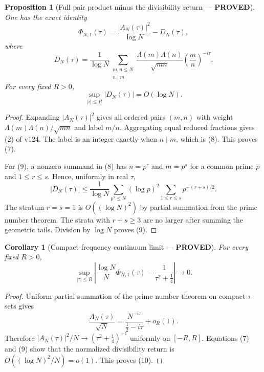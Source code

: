 \documentclass[11pt]{article}
\newcommand{\PROVED}{\textcolor{green!40!black}{\textbf{PROVED}}}
\newtheorem{proposition}{Proposition}
\newtheorem{corollary}{Corollary}
\begin{document}
\begin{proposition}[Full pair product minus the divisibility return ---
\PROVED]
One has the exact identity
\begin{equation}
 \boxed{
 \Phi_{N,1}(\tau)
 =\frac{|A_N(\tau)|^2}{\log N}-D_N(\tau),}                \tag{7}
\end{equation}
where
\begin{equation}
 D_N(\tau)=\frac1{\log N}
 \sum_{\substack{m,n\le N\\n\mid m}}
 \frac{\Lambda(m)\Lambda(n)}{\sqrt{mn}}
 \left(\frac mn\right)^{-i\tau}.                         \tag{8}
\end{equation}
For every fixed $R>0$,
\begin{equation}
 \sup_{|\tau|\le R}|D_N(\tau)|=O(\log N).                \tag{9}
\end{equation}
\end{proposition}

\begin{proof}
Expanding $|A_N(\tau)|^2$ gives all ordered pairs $(m,n)$ with weight
$\Lambda(m)\Lambda(n)/\sqrt{mn}$ and label $m/n$.  Aggregating equal
reduced fractions gives (2) of v124.  The label is an integer exactly when
$n\mid m$, which is (8).  This proves (7).

For (9), a nonzero summand in (8) has $n=p^r$ and $m=p^s$ for a common
prime $p$ and $1\le r\le s$.  Hence, uniformly in real $\tau$,
\[
 |D_N(\tau)|
 \le\frac1{\log N}\sum_{p^s\le N}(\log p)^2
       \sum_{1\le r\le s}p^{-(r+s)/2}.
\]
The stratum $r=s=1$ is $O((\log N)^2)$ by partial summation from the prime
number theorem.  The strata with $r+s\ge3$ are no larger after summing the
geometric tails.  Division by $\log N$ proves (9).
\end{proof}

\begin{corollary}[Compact-frequency continuum limit --- \PROVED]
For every fixed $R>0$,
\begin{equation}
 \boxed{
 \sup_{|\tau|\le R}
 \left|
 \frac{\log N}{N}\Phi_{N,1}(\tau)
 -\frac1{\tau^2+\frac14}
 \right|\longrightarrow0.}                               \tag{10}
\end{equation}
\end{corollary}

\begin{proof}
Uniform partial summation of the prime number theorem on compact
$\tau$-sets gives
\begin{equation}
 \frac{A_N(\tau)}{\sqrt N}
 =\frac{N^{-i\tau}}{\frac12-i\tau}+o_R(1).                 \tag{11}
\end{equation}
Therefore
$|A_N(\tau)|^2/N\to(\tau^2+\frac14)^{-1}$ uniformly on
$[-R,R]$.  Equations (7) and (9) show that the normalized divisibility
return is $O((\log N)^2/N)=o(1)$.  This proves (10).
\end{proof}
\end{document}
